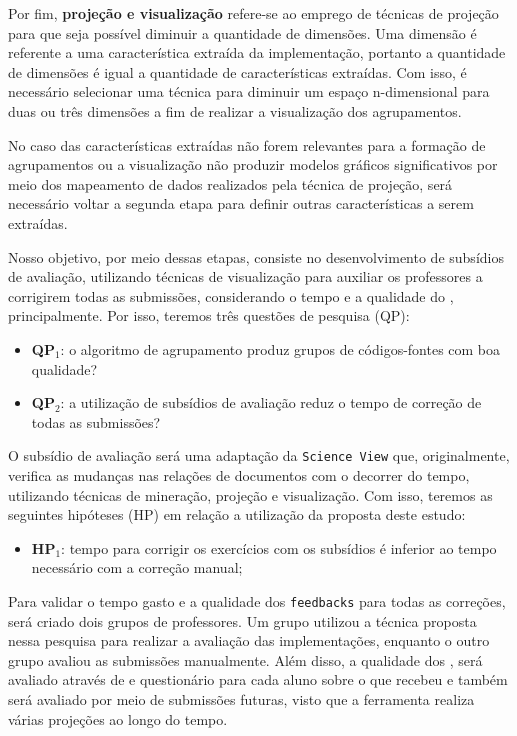 	 	Por fim, \textbf{projeção e visualização} refere-se ao emprego de técnicas de
	 	projeção para que seja possível diminuir a quantidade de dimensões. Uma dimensão
	 	é referente a uma característica extraída da implementação, portanto a quantidade
	 	de dimensões é igual a quantidade de características extraídas. Com isso, é
	 	necessário selecionar uma técnica para diminuir um espaço n-dimensional para
	 	duas ou três dimensões a fim de realizar a visualização dos agrupamentos.
	 	
	 	No caso das características extraídas não forem relevantes para a formação de
	 	agrupamentos ou a visualização não produzir modelos gráficos significativos por
	 	meio dos mapeamento de dados realizados pela técnica de projeção, será necessário
	 	voltar a segunda etapa para definir outras características a serem extraídas.
	 	
	 	Nosso objetivo, por meio dessas etapas, consiste no desenvolvimento de subsídios
	 	de avaliação, utilizando técnicas de visualização para auxiliar os professores a
	 	corrigirem todas as submissões, considerando o tempo e a qualidade do ,
	 	principalmente. Por isso, teremos três questões de pesquisa (QP):
	 	
	 	\begin{itemize}
	 		\item \textbf{QP$_1$}: o algoritmo de agrupamento produz grupos de códigos-fontes
	 		com boa qualidade?
	 		\item \textbf{QP$_2$}: a utilização de subsídios de avaliação reduz o tempo
	 		de correção de todas as submissões?
	 	\end{itemize}
	 	
	 	O subsídio de avaliação será uma adaptação da \texttt{Science View} \cite{Alencar-etal:2012}
	 	que, originalmente, verifica as mudanças nas relações de documentos com o decorrer do tempo,
	 	utilizando técnicas de mineração, projeção e visualização. Com isso, teremos as
	 	seguintes hipóteses (HP) em relação a utilização da proposta deste estudo:
	 	
	 	\begin{itemize}
	 		\item \textbf{HP$_1$}: tempo para corrigir os exercícios com os subsídios é inferior
	 		ao tempo necessário com a correção manual;
	 	\end{itemize}
	 	
	 	Para validar o tempo gasto e a qualidade dos \texttt{feedbacks} para todas as correções,
	 	será criado dois grupos de professores. Um grupo utilizou a técnica proposta nessa pesquisa para
	 	realizar a avaliação das implementações, enquanto o outro grupo avaliou as submissões
	 	manualmente. Além disso, a qualidade dos , será avaliado através de 
	 	e questionário para cada aluno sobre o  que recebeu e também será avaliado
	 	por meio de submissões futuras, visto que a ferramenta realiza várias projeções ao longo do tempo.


